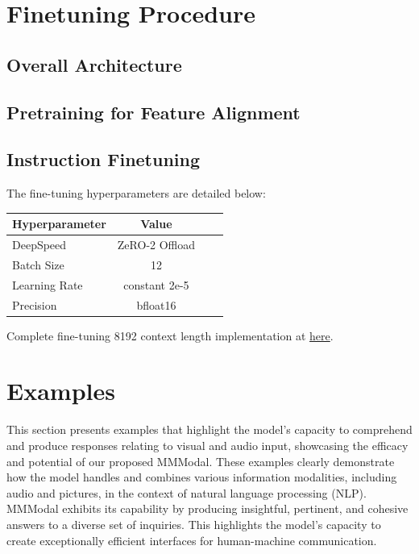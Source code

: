 \documentclass[preprint]{article}
\begin{document}
\section{Finetuning Procedure}

\subsection{Overall Architecture}

\subsection{Pretraining for Feature Alignment}

\subsection{Instruction Finetuning}

The fine-tuning hyperparameters are detailed below:


\begin{table}[h]
  \centering
  \begin{tabular}{lccl}
    \hline
    \textbf{Hyperparameter} & \textbf{Value} \\
    \hline
    DeepSpeed               & ZeRO-2 Offload \\
    Batch Size              & 12             \\
    Learning Rate           & constant 2e-5  \\
    Precision               & bfloat16       \\
    \hline
  \end{tabular}
\end{table}

Complete fine-tuning 8192 context length implementation at \href{https://github.com/mesolitica/multimodal-LLM/blob/master/run-deepspeed.sh}{here}.

\pagebreak

\section{Examples}

This section presents examples that highlight the model's capacity to comprehend and produce responses relating to visual and audio input, showcasing the efficacy and potential of our proposed MMModal. These examples clearly demonstrate how the model handles and combines various information modalities, including audio and pictures, in the context of natural language processing (NLP). MMModal exhibits its capability by producing insightful, pertinent, and cohesive answers to a diverse set of inquiries. This highlights the model's capacity to create exceptionally efficient interfaces for human-machine communication.
\end{document}
